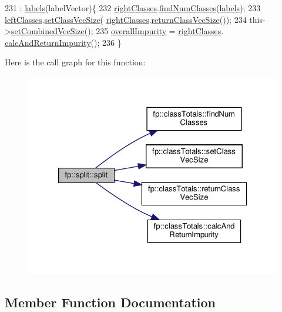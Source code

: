 \begin{DoxyCode}
231                                                         : \hyperlink{classfp_1_1split_a9658b163c2cd30e9900e21c3b1c3f2f9}{labels}(labelVector)\{
232                     \hyperlink{classfp_1_1split_af5366297f7de9b8ff0911186300bab7e}{rightClasses}.\hyperlink{classfp_1_1classTotals_a4d042d3a31d3f03d577bd4ad02bb5e6a}{findNumClasses}(\hyperlink{classfp_1_1split_a9658b163c2cd30e9900e21c3b1c3f2f9}{labels});
233                     \hyperlink{classfp_1_1split_a3be6dcf32281715e6376e9f5f8da18f0}{leftClasses}.\hyperlink{classfp_1_1classTotals_a026ec5ce8d0ad54702891c0d6ba51fc8}{setClassVecSize}(
      \hyperlink{classfp_1_1split_af5366297f7de9b8ff0911186300bab7e}{rightClasses}.\hyperlink{classfp_1_1classTotals_a088c363e5ae669d52e4836bc900d6a73}{returnClassVecSize}());
234                     this->\hyperlink{classfp_1_1split_a9c1560ae01a536ed0245d667ee7d5fb6}{setCombinedVecSize}();
235                     \hyperlink{classfp_1_1split_a1eba74d8afed2852da3eb004afe76bb7}{overallImpurity} = \hyperlink{classfp_1_1split_af5366297f7de9b8ff0911186300bab7e}{rightClasses}.
      \hyperlink{classfp_1_1classTotals_a94eaf5d719442de6f7014b0630932bb8}{calcAndReturnImpurity}();
236                 \}
\end{DoxyCode}
Here is the call graph for this function\+:
\nopagebreak
\begin{figure}[H]
\begin{center}
\leavevmode
\includegraphics[width=326pt]{classfp_1_1split_aa47c5cf1e4d7c99506b659df7ab75e14_cgraph}
\end{center}
\end{figure}


\subsection{Member Function Documentation}
\mbox{\label{classfp_1_1split_ac75c6034210f3c53ff3435e2d12377e1}} 
